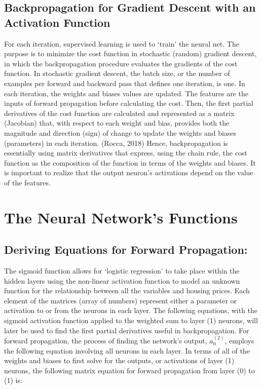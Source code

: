 \documentclass[12pt,a4paper]{article}
\begin{document}
\subsection{Backpropagation for Gradient Descent with an Activation Function}
For each iteration, supervised learning is used to ‘train’ the neural net. The purpose is to minimize the cost function in stochastic (random) gradient descent, in which the backpropagation procedure evaluates the gradients of the cost function. In stochastic gradient descent, the batch size, or the number of examples per forward and backward pass that defines one iteration, is one. In each iteration, the weights and biases values are updated. The features are the inputs of forward propagation before calculating the cost. Then, the first partial derivatives of the cost function are calculated and represented as a matrix (Jacobian) that, with respect to each weight and bias, provides both the magnitude and direction (sign) of change to update the weights and biases (parameters) in each iteration. (Rocca, 2018) Hence, backpropagation is essentially using matrix derivatives that express, using the chain rule, the cost function as the composition of the function in terms of the weights and biases. It is important to realize that the output neuron’s activations depend on the value of the features.





\section{The Neural Network’s Functions}

\subsection{Deriving Equations for Forward Propagation:}
The sigmoid function allows for ‘logistic regression’ to take place within the hidden layers using the non-linear activation function to model an unknown function for the relationship between all the variables and housing prices. Each element of the matrices (array of numbers) represent either a parameter or activation to or from the neurons in each layer. The following equations, with the sigmoid activation function applied to the weighted sum to layer (1) neurons, will later be used to find the first partial derivatives useful in backpropagation. For forward propagation, the process of finding the network’s output, $a_0^{\left(2\right)}$, employs the following equation involving all neurons in each layer. In terms of all of the weights and biases to first solve for the outputs, or activations of layer (1) neurons, the following matrix equation for forward propagation from layer (0) to (1) is:
\end{document}
